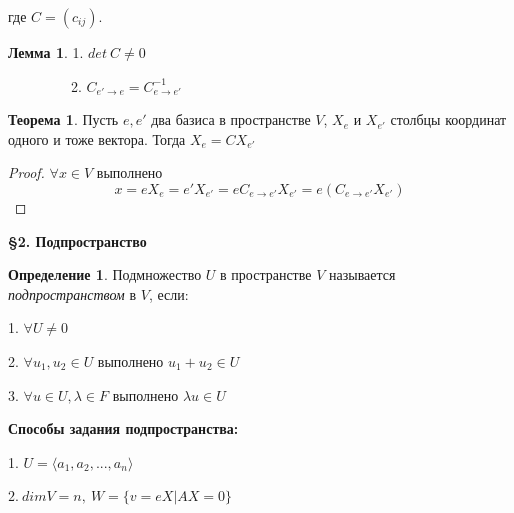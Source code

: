 \documentclass[a4paper, 12pt]{article}
\theoremstyle{definition}
\newtheorem*{definition}{Определение}
\newtheorem*{theorem}{Теорема}
\newtheorem*{lemma}{Лемма}
\begin{document}
    где $ C=(c_{ij})$.
    \begin{lemma}
        1. $det\ C\neq 0$

        \ \ \ \ \ \ \ \ \ 2. $C_{e'\to e}=C_{e\to e'}^{-1}$
    \end{lemma}
    \begin{theorem}
        Пусть $e, e'$ два базиса в пространстве $V$,
        $X_e$ и $X_{e'}$ столбцы координат одного и тоже вектора.
        Тогда $X_e = CX_{e'}$
    \end{theorem}
    \begin{proof}
        $\forall x\in V$ выполнено $$x= eX_e= e'X_{e'}= 
        eC_{e\to e'}X_{e'}= e(C_{e\to e'}X_{e'})$$
    \end{proof}
    \newpage
    \begin{center}
        \begin{Large}
            \textbf{\S2. Подпространство}
        \end{Large}
    \end{center}
    \begin{definition}
        Подмножество $U$ в пространстве $V$ называется\\
        \textit{подпространством} в $V$, если:

        1. $\forall U\neq 0$

        2. $\forall u_1, u_2 \in U$ выполнено $u_1 + u_2 \in U$

        3. $\forall u \in U, \lambda \in F$ выполнено
        $\lambda u\in U$
    \end{definition}
    \textbf{Способы задания подпространства:}

    1. $U =\langle a_1, a_2,..., a_n\rangle$

    $2.\ dimV = n,\ W = \{v = eX|AX = 0\}$
\end{document}
